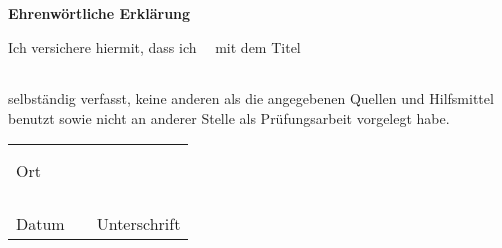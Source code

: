 \pagestyle{plain}


\textbf{{\Large Ehrenwörtliche Erklärung}}
\vspace{2cm}

  {\newcommand{\DocumentArticle}{meinen}}
  {
      {\newcommand{\DocumentArticle}{meine}}
      {
          {\newcommand{\DocumentArticle}{meine}}
          {\newcommand{\DocumentArticle}{meine/n}}
      }
  }

Ich versichere hiermit, dass ich \DocumentArticle\ \DocumentType \ mit dem Titel
\vspace{1cm}

\begin{tabular*}{\linewidth}{@{\extracolsep{\fill}}ccc}
 \\ \hline
 \vspace{2cm}
 \\ \hline
\end{tabular*}
\vspace{2cm}

selbständig verfasst, keine anderen als die angegebenen Quellen und Hilfsmittel benutzt
sowie nicht an anderer Stelle als Prüfungsarbeit vorgelegt habe.
\vfill

\begin{table*}[hp]
  \centering
  \begin{tabular}{L{6cm}L{2cm}L{6cm}}
    & & \\
    & & \\ 
    Ort &  \\
    & & \\
    & & \\
    & & \\
    & &  \\  
    Datum & & Unterschrift \\
  \end{tabular}
\end{table*}